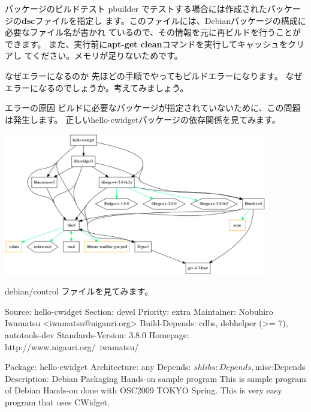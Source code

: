 \begin{frame}[containsverbatim]{パッケージのビルドテスト}
pbuilder でテストする場合には作成されたパッケージの{\bf dsc}ファイルを指定し
ます。このファイルには、Debianパッケージの構成に必要なファイル名が書かれ
ているので、その情報を元に再ビルドを行うことができます。
また、実行前に{\bf apt-get clean}コマンドを実行してキャッシュをクリアし
てください。メモリが足りないためです。
\end{frame}

\begin{frame}{なぜエラーになるのか}
先ほどの手順でやってもビルドエラーになります。
なぜエラーになるのでしょうか。考えてみましょう。
\end{frame}

\begin{frame}[containsverbatim]{エラーの原因}
ビルドに必要なパッケージが指定されていないために、この問題は発生します。
正しいhello-cwidgetパッケージの依存関係を見てみます。
\end{frame}

\begin{frame}
\begin{center}
\includegraphics[width=11.5cm]{image200902/cwidget.png}
\end{center}
\end{frame}

\begin{frame}[containsverbatim]
debian/control ファイルを見てみます。

\begin{commandline}
Source: hello-cwidget
Section: devel
Priority: extra
Maintainer: Nobuhiro Iwamatsu <iwamatsu@nigauri.org>
Build-Depends: cdbs, debhelper (>= 7), autotools-dev
Standards-Version: 3.8.0
Homepage: http://www.nigauri.org/~iwamatsu/

Package: hello-cwidget
Architecture: any
Depends: ${shlibs:Depends}, ${misc:Depends}
Description: Debian Packaging Hands-on sample program
 This is sample program of Debian Hands-on done with
 OSC2009 TOKYO Spring.
 This is very easy program that uses CWidget.
\end{commandline}
\end{frame}


